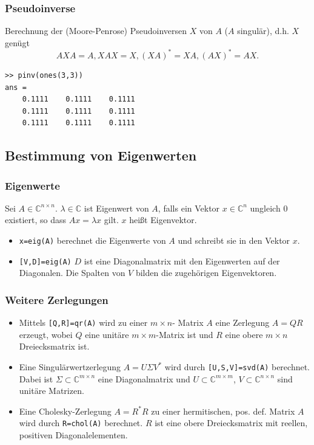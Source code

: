 % 
%
\begin{frame}[fragile]\frametitle{Pseudoinverse}
Berechnung der (Moore-Penrose) Pseudoinversen $X$ von $A$ ($A$ singulär),
  d.h. $X$ genügt
{ \[ A X A=A,  X A X =X,  (X A)^* =X A,  (A X )^* = A X. \]}
\begin{lstlisting}
>> pinv(ones(3,3))
ans =
    0.1111    0.1111    0.1111
    0.1111    0.1111    0.1111
    0.1111    0.1111    0.1111
\end{lstlisting}
\end{frame}

\subsection{Bestimmung von Eigenwerten}
% 
%
\begin{frame}[fragile]\frametitle{Eigenwerte}
Sei $A \in \mathbb{C}^{n \times n}$. $\lambda \in \mathbb{C}$ ist
Eigenwert von $A$, falls ein Vektor $x \in \mathbb{C}^n$ ungleich $0$ existiert, so
dass  $Ax = \lambda x$ gilt. $x$ heißt Eigenvektor. 
\begin{itemize}
\item {}\lstinline!x=eig(A)! berechnet die Eigenwerte von $A$ und schreibt
  sie in den Vektor $x$.
\item
  {}\lstinline![V,D]=eig(A)!
  $D$ ist eine Diagonalmatrix mit den Eigenwerten auf der
  Diagonalen. Die Spalten von $V$ bilden die zugehörigen Eigenvektoren. 
\end{itemize}
\end{frame}
% 
%
\begin{frame}[fragile]\frametitle{Weitere Zerlegungen}
\begin{itemize}
\item Mittels \lstinline![Q,R]=qr(A)! wird zu einer $m \times n$- Matrix
  $A$ eine Zerlegung { $A=QR$} erzeugt,
  wobei $Q$ eine unitäre $m \times m$-Matrix ist und $R$ eine obere
   $m \times n$ Dreiecksmatrix   ist.
\item Eine Singulärwertzerlegung { $A=U \Sigma V^*$} wird durch 
  \lstinline![U,S,V]=svd(A)!
  berechnet. Dabei ist $\Sigma \subset \mathbb{C}^{m \times n}$ eine
  Diagonalmatrix und  $U \subset \mathbb{C}^{m \times m}$, $V \subset
  \mathbb{C}^{n \times n}$  sind unitäre Matrizen. 
\item Eine Cholesky-Zerlegung { $A=R^*R$} 
zu einer hermitischen, pos. def. Matrix
  $A$ wird durch  \lstinline!R=chol(A)!
  berechnet. $R$ ist eine obere Dreiecksmatrix mit reellen, positiven
  Diagonalelementen. 
\end{itemize}
\end{frame}
